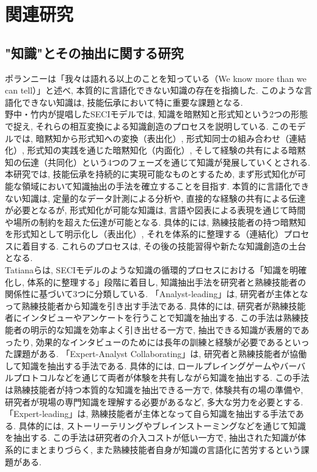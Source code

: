\chapter{関連研究}
\section{"知識"とその抽出に関する研究}
ポランニーは「我々は語れる以上のことを知っている（We know more than we can tell）」と述べ, 本質的に言語化できない知識の存在を指摘した\cite{Polanyi1966}. このような言語化できない知識は, 技能伝承において特に重要な課題となる.\\

野中・竹内が提唱したSECIモデルでは, 知識を暗黙知と形式知という2つの形態で捉え, それらの相互変換による知識創造のプロセスを説明している\cite{Nonaka1996}. このモデルでは, 暗黙知から形式知への変換（表出化）, 形式知同士の組み合わせ（連結化）, 形式知の実践を通じた暗黙知化（内面化）, そして経験の共有による暗黙知の伝達（共同化）という4つのフェーズを通じて知識が発展していくとされる.\\

本研究では, 技能伝承を持続的に実現可能なものとするため, まず形式知化が可能な領域において知識抽出の手法を確立することを目指す. 本質的に言語化できない知識は, 定量的なデータ計測による分析や, 直接的な経験の共有による伝達が必要となるが, 形式知化が可能な知識は, 言語や図表による表現を通じて時間や場所の制約を超えた伝達が可能となる. 具体的には, 熟練技能者の持つ暗黙知を形式知として明示化し（表出化）, それを体系的に整理する（連結化）プロセスに着目する. これらのプロセスは, その後の技能習得や新たな知識創造の土台となる.\\

Tatianaらは, SECIモデルのような知識の循環的プロセスにおける「知識を明確化し, 体系的に整理する」段階に着目し, 知識抽出手法を研究者と熟練技能者の関係性に基づいて3つに分類している\cite{Tatiana2012}. 「Analyst-leading」は, 研究者が主体となって熟練技能者から知識を引き出す手法である. 具体的には, 研究者が熟練技能者にインタビューやアンケートを行うことで知識を抽出する. この手法は熟練技能者の明示的な知識を効率よく引き出せる一方で, 抽出できる知識が表層的であったり, 効果的なインタビューのためには長年の訓練と経験が必要であるといった課題がある. 「Expert-Analyst Collaborating」は, 研究者と熟練技能者が協働して知識を抽出する手法である. 具体的には, ロールプレイングゲームやバーバルプロトコルなどを通じて両者が体験を共有しながら知識を抽出する. この手法は熟練技能者が持つ本質的な知識を抽出できる一方で, 体験共有の場の準備や, 研究者が現場の専門知識を理解する必要があるなど, 多大な労力を必要とする. 「Expert-leading」は, 熟練技能者が主体となって自ら知識を抽出する手法である. 具体的には, ストーリーテリングやブレインストーミングなどを通じて知識を抽出する. この手法は研究者の介入コストが低い一方で, 抽出された知識が体系的にまとまりづらく, また熟練技能者自身が知識の言語化に苦労するという課題がある.\\

